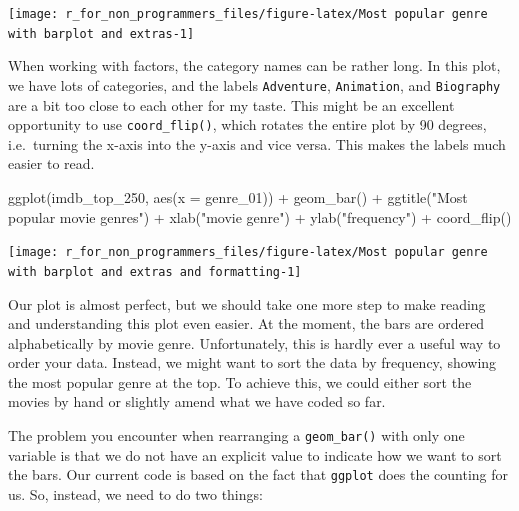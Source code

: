 \documentclass[
]{book}
\newenvironment{Shaded}{\begin{snugshade}}{\end{snugshade}}
\newcommand{\AttributeTok}[1]{\textcolor[rgb]{0.77,0.63,0.00}{#1}}
\newcommand{\FunctionTok}[1]{\textcolor[rgb]{0.00,0.00,0.00}{#1}}
\newcommand{\NormalTok}[1]{#1}
\newcommand{\SpecialCharTok}[1]{\textcolor[rgb]{0.00,0.00,0.00}{#1}}
\newcommand{\StringTok}[1]{\textcolor[rgb]{0.31,0.60,0.02}{#1}}
\begin{document}
\begin{center}\texttt{[image: r\_for\_non\_programmers\_files/figure-latex/Most popular genre with barplot and extras-1]} \end{center}

When working with factors, the category names can be rather long. In this plot, we have lots of categories, and the labels \texttt{Adventure}, \texttt{Animation}, and \texttt{Biography} are a bit too close to each other for my taste. This might be an excellent opportunity to use \texttt{coord\_flip()}, which rotates the entire plot by 90 degrees, i.e.~turning the x-axis into the y-axis and vice versa. This makes the labels much easier to read.

\begin{Shaded}
\begin{Highlighting}[]
\FunctionTok{ggplot}\NormalTok{(imdb\_top\_250, }\FunctionTok{aes}\NormalTok{(}\AttributeTok{x =}\NormalTok{ genre\_01)) }\SpecialCharTok{+}
  \FunctionTok{geom\_bar}\NormalTok{() }\SpecialCharTok{+}
  \FunctionTok{ggtitle}\NormalTok{(}\StringTok{"Most popular movie genres"}\NormalTok{) }\SpecialCharTok{+}
  \FunctionTok{xlab}\NormalTok{(}\StringTok{"movie genre"}\NormalTok{) }\SpecialCharTok{+}
  \FunctionTok{ylab}\NormalTok{(}\StringTok{"frequency"}\NormalTok{) }\SpecialCharTok{+}
  \FunctionTok{coord\_flip}\NormalTok{()}
\end{Highlighting}
\end{Shaded}

\begin{center}\texttt{[image: r\_for\_non\_programmers\_files/figure-latex/Most popular genre with barplot and extras and formatting-1]} \end{center}

Our plot is almost perfect, but we should take one more step to make reading and understanding this plot even easier. At the moment, the bars are ordered alphabetically by movie genre. Unfortunately, this is hardly ever a useful way to order your data. Instead, we might want to sort the data by frequency, showing the most popular genre at the top. To achieve this, we could either sort the movies by hand or slightly amend what we have coded so far.

The problem you encounter when rearranging a \texttt{geom\_bar()} with only one variable is that we do not have an explicit value to indicate how we want to sort the bars. Our current code is based on the fact that \texttt{ggplot} does the counting for us. So, instead, we need to do two things:
\end{document}
